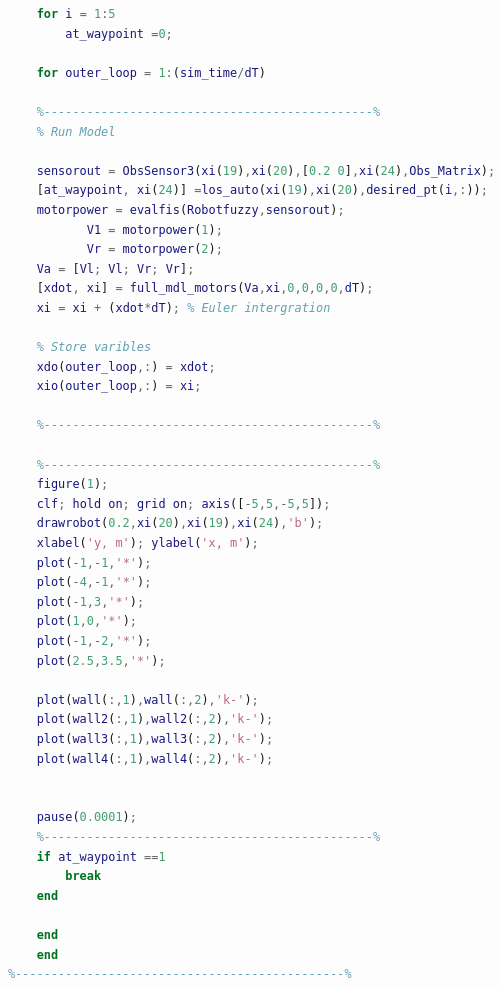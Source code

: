 \documentclass{l4proj}
\begin{document}
\begin{lstlisting}[language=Matlab, float, caption={Task 2 ,Without additional waypoints (Test 1)}, label=lst:callahan]    
    %----------------------------------------------%
    for i = 1:5 
        at_waypoint =0;
    
    for outer_loop = 1:(sim_time/dT)

    %----------------------------------------------%
    % Run Model
   
    sensorout = ObsSensor3(xi(19),xi(20),[0.2 0],xi(24),Obs_Matrix);
    [at_waypoint, xi(24)] =los_auto(xi(19),xi(20),desired_pt(i,:));
    motorpower = evalfis(Robotfuzzy,sensorout);
           V1 = motorpower(1);
           Vr = motorpower(2);
    Va = [Vl; Vl; Vr; Vr];
    [xdot, xi] = full_mdl_motors(Va,xi,0,0,0,0,dT);   
    xi = xi + (xdot*dT); % Euler intergration
    
    % Store varibles
    xdo(outer_loop,:) = xdot;
    xio(outer_loop,:) = xi;

    %----------------------------------------------%
    
    %----------------------------------------------%
    figure(1);
    clf; hold on; grid on; axis([-5,5,-5,5]);
    drawrobot(0.2,xi(20),xi(19),xi(24),'b');
    xlabel('y, m'); ylabel('x, m');
    plot(-1,-1,'*');
    plot(-4,-1,'*');
    plot(-1,3,'*');
    plot(1,0,'*');
    plot(-1,-2,'*');
    plot(2.5,3.5,'*');
    
    plot(wall(:,1),wall(:,2),'k-');
    plot(wall2(:,1),wall2(:,2),'k-');
    plot(wall3(:,1),wall3(:,2),'k-');
    plot(wall4(:,1),wall4(:,2),'k-');
  
    
    pause(0.0001);
    %----------------------------------------------%
    if at_waypoint ==1
        break
    end

    end
    end
%----------------------------------------------%
 \end{lstlisting}
\end{document}
